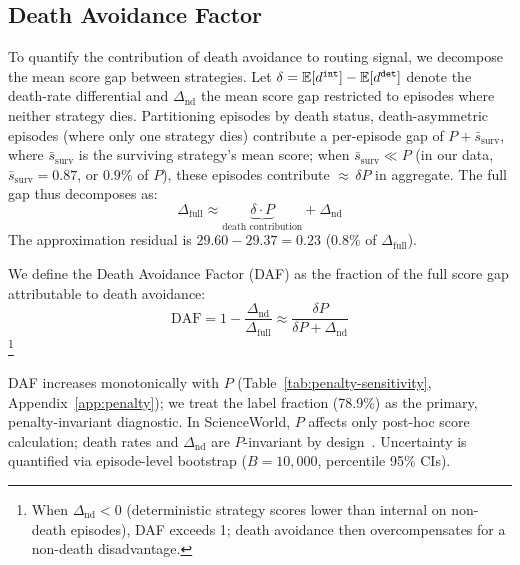 \subsection{Death Avoidance Factor}
\label{sec:daf}

To quantify the contribution of death avoidance to routing signal, we decompose the mean score gap between strategies. Let $\delta = \mathbb{E}[d^{\tt int}] - \mathbb{E}[d^{\tt det}]$ denote the death-rate differential and $\Delta_{\text{nd}}$ the mean score gap restricted to episodes where neither strategy dies. Partitioning episodes by death status, death-asymmetric episodes (where only one strategy dies) contribute a per-episode gap of $P + \bar{s}_{\text{surv}}$, where $\bar{s}_{\text{surv}}$ is the surviving strategy's mean score; when $\bar{s}_{\text{surv}} \ll P$ (in our data, $\bar{s}_{\text{surv}} = 0.87$, or $0.9\%$ of $P$), these episodes contribute ${\approx}\,\delta P$ in aggregate. The full gap thus decomposes as:
\begin{equation}
    \Delta_{\text{full}} \approx \underbrace{\delta \cdot P}_{\text{death contribution}} + \Delta_{\text{nd}}
\end{equation}
The approximation residual is $29.60 - 29.37 = 0.23$ ($0.8\%$ of $\Delta_{\text{full}}$).

We define the Death Avoidance Factor (DAF) as the fraction of the full score gap attributable to death avoidance:
\begin{equation}
    \text{DAF} = 1 - \frac{\Delta_{\text{nd}}}{\Delta_{\text{full}}} \approx \frac{\delta P}{\delta P + \Delta_{\text{nd}}}
\end{equation}%
\footnote{When $\Delta_{\text{nd}} < 0$ (deterministic strategy scores lower than internal on non-death episodes), DAF exceeds 1; death avoidance then overcompensates for a non-death disadvantage.}

DAF increases monotonically with $P$ (Table~\ref{tab:penalty-sensitivity}, Appendix~\ref{app:penalty}); we treat the label fraction (78.9\%) as the primary, penalty-invariant diagnostic. In ScienceWorld, $P$ affects only post-hoc score calculation; death rates and $\Delta_{\text{nd}}$ are $P$-invariant by design~\citep{ng1999policy}. Uncertainty is quantified via episode-level bootstrap ($B{=}10{,}000$, percentile 95\% CIs).
